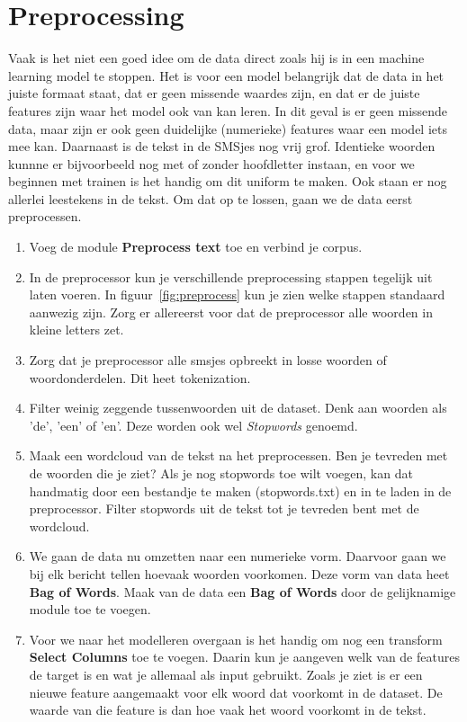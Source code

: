 \documentclass{article}
\newcommand{\tb}[1]{\textbf{#1}}
\begin{document}
\section{Preprocessing}
Vaak is het niet een goed idee om de data direct zoals hij is in een machine learning model te stoppen. Het is voor een model belangrijk dat de data in het juiste formaat staat, dat er geen missende waardes zijn, en dat er de juiste features zijn waar het model ook van kan leren.
In dit geval is er geen missende data, maar zijn er ook geen duidelijke (numerieke) features waar een model iets mee kan. Daarnaast is de tekst in de SMSjes nog vrij grof. Identieke woorden kunnne er bijvoorbeeld nog met of zonder hoofdletter instaan, en voor we beginnen met trainen is het handig om dit uniform te maken. Ook staan er nog allerlei leestekens in de tekst. Om dat op te lossen, gaan we de data eerst preprocessen.

\begin{enumerate}
\item Voeg de module \tb{Preprocess text} toe en verbind je corpus.
\item In de preprocessor kun je verschillende preprocessing stappen tegelijk uit laten voeren. In figuur~\ref{fig:preprocess} kun je zien welke stappen standaard aanwezig zijn. Zorg er allereerst voor dat de preprocessor alle woorden in kleine letters zet.
\item Zorg dat je preprocessor alle smsjes opbreekt in losse woorden of woordonderdelen. Dit heet tokenization.
\item Filter weinig zeggende tussenwoorden uit de dataset. Denk aan woorden als 'de', 'een' of 'en'. Deze worden ook wel \textit{Stopwords} genoemd.
\item Maak een wordcloud van de tekst na het preprocessen. Ben je tevreden met de woorden die je ziet? Als je nog stopwords toe wilt voegen, kan dat handmatig door een bestandje te maken (stopwords.txt) en in te laden in de preprocessor. Filter stopwords uit de tekst tot je tevreden bent met de wordcloud.
\item We gaan de data nu omzetten naar een numerieke vorm. Daarvoor gaan we bij elk bericht tellen hoevaak woorden voorkomen. Deze vorm van data heet \tb{Bag of Words}. Maak van de data een \tb{Bag of Words} door de gelijknamige module toe te voegen.
\item Voor we naar het modelleren overgaan is het handig om nog een transform \tb{Select Columns} toe te voegen. Daarin kun je aangeven welk van de features de target is en wat je allemaal als input gebruikt. Zoals je ziet is er een nieuwe feature aangemaakt voor elk woord dat voorkomt in de dataset. De waarde van die feature is dan hoe vaak het woord voorkomt in de tekst.
\end{enumerate}
\end{document}
